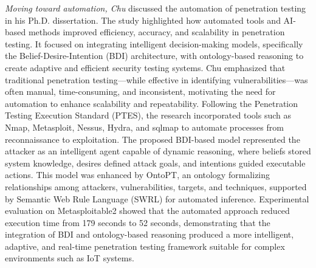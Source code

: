 \textit{Moving toward automation, Chu} discussed the automation of penetration testing in his Ph.D. dissertation. The study highlighted how automated tools and AI-based methods improved efficiency, accuracy, and scalability in penetration testing. It focused on integrating intelligent decision-making models, specifically the Belief-Desire-Intention (BDI) architecture, with ontology-based reasoning to create adaptive and efficient security testing systems. Chu emphasized that traditional penetration testing—while effective in identifying vulnerabilities—was often manual, time-consuming, and inconsistent, motivating the need for automation to enhance scalability and repeatability. Following the Penetration Testing Execution Standard (PTES), the research incorporated tools such as Nmap, Metasploit, Nessus, Hydra, and sqlmap to automate processes from reconnaissance to exploitation. The proposed BDI-based model represented the attacker as an intelligent agent capable of dynamic reasoning, where beliefs stored system knowledge, desires defined attack goals, and intentions guided executable actions. This model was enhanced by OntoPT, an ontology formalizing relationships among attackers, vulnerabilities, targets, and techniques, supported by Semantic Web Rule Language (SWRL) for automated inference. Experimental evaluation on Metasploitable2 showed that the automated approach reduced execution time from 179 seconds to 52 seconds, demonstrating that the integration of BDI and ontology-based reasoning produced a more intelligent, adaptive, and real-time penetration testing framework suitable for complex environments such as IoT systems. \cite{chu2021}

